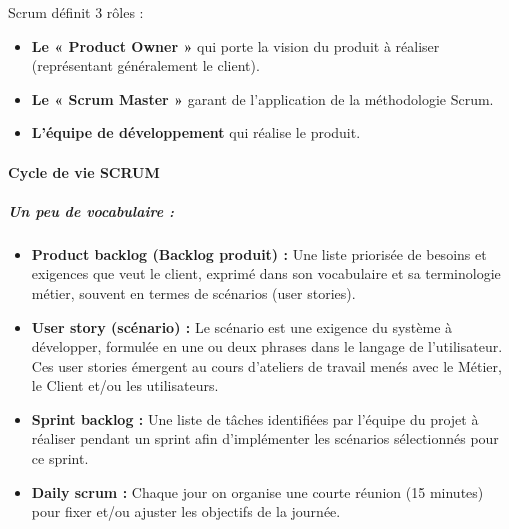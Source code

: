 Scrum définit 3 rôles :​
\begin{itemize}
    \item \textbf{Le « Product Owner »} qui porte la vision du produit à réaliser (représentant généralement le client).
    \item \textbf{Le « Scrum Master »} garant de l'application de la méthodologie Scrum.
    \item \textbf{L'équipe de développement} qui réalise le produit.
\end{itemize}

\paragraph{Cycle de vie SCRUM}
\subparagraph{Un peu de vocabulaire :}
\begin{itemize}
    \item \textbf{Product backlog (Backlog produit) : } Une liste priorisée de besoins et exigences que veut le client, exprimé dans son vocabulaire et sa terminologie métier, souvent en termes de scénarios (user stories).
    \item \textbf{User story (scénario) : }Le scénario est une exigence du système à développer, formulée en une ou deux phrases dans le langage de l'utilisateur. Ces user stories émergent au cours d'ateliers de travail menés avec le Métier, le Client et/ou les utilisateurs.
    \item \textbf{Sprint backlog : }Une liste de tâches identifiées par l'équipe du projet à réaliser pendant un sprint afin d'implémenter les scénarios sélectionnés pour ce sprint.
    \item \textbf{Daily scrum : }Chaque jour on organise une courte réunion (15 minutes) pour fixer et/ou ajuster les objectifs de la journée.
\end{itemize}

